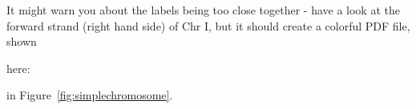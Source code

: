 It might warn you about the labels being too close together - have a look
at the forward strand (right hand side) of Chr I, but it should create a
colorful PDF file, shown
\begin{htmlonly}
here:


\end{htmlonly}
\begin{latexonly}
in Figure~\ref{fig:simplechromosome}.
\end{latexonly}
